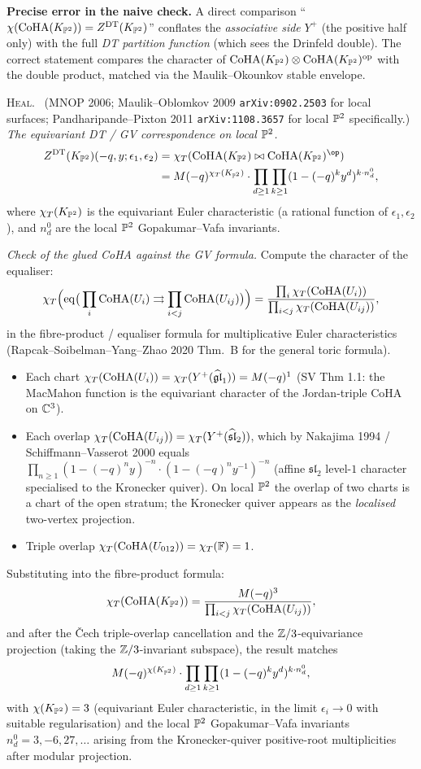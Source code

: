 \textbf{Precise error in the naive check.} A direct comparison
``$\chi(\mathrm{CoHA}(K_{\mathbb{P}^2}))=Z^{\mathrm{DT}}(K_{\mathbb{P}^2})$'' conflates the \emph{
associative side} $Y^+$ (the positive half only) with the full
\emph{DT partition function} (which sees the Drinfeld double). The
correct statement compares the character of $\mathrm{CoHA}(K_{\mathbb{P}^2})\otimes
\mathrm{CoHA}(K_{\mathbb{P}^2})^{\mathrm{op}}$ with the double product, matched via
the Maulik--Okounkov stable envelope.

\textsc{Heal.} \ClaimStatusTheorem\ (MNOP 2006;
Maulik--Oblomkov 2009 \texttt{arXiv:0902.2503} for local surfaces;
Pandharipande--Pixton 2011 \texttt{arXiv:1108.3657} for local $\mathbb{P}^2$
specifically.) \emph{The equivariant DT / GV correspondence on local
$\mathbb{P}^2$.}
\begin{align*}
Z^\DT(K_{\bP^2})(-q,y;\epsilon_1,\epsilon_2)
&=\chi_T(\CoHA(K_{\bP^2})\bowtie\CoHA(K_{\bP^2})^\op)\\
&=M(-q)^{\chi_T(K_{\bP^2})}\cdot\prod_{d\geq 1}\prod_{k\geq 1}
(1-(-q)^ky^d)^{k\cdot n_d^0},
\end{align*}
where $\chi_T(K_{\mathbb{P}^2})$ is the equivariant Euler characteristic
(a rational function of $\epsilon_1,\epsilon_2$), and $n_d^0$ are the
local $\mathbb{P}^2$ Gopakumar--Vafa invariants.

\emph{Check of the glued CoHA against the GV formula.} Compute the
character of the equaliser:
\[
\chi_T\Big(\mathrm{eq}\big(\prod_i\mathrm{CoHA}(U_i)\rightrightarrows\prod_{i<j}
\mathrm{CoHA}(U_{ij})\big)\Big)
=\frac{\prod_i\chi_T(\mathrm{CoHA}(U_i))}{\prod_{i<j}\chi_T(\mathrm{CoHA}(U_{ij}))},
\]
in the fibre-product / equaliser formula for multiplicative Euler
characteristics (Rapcak--Soibelman--Yang--Zhao 2020 Thm.\ B for the
general toric formula).
\begin{itemize}
\item Each chart $\chi_T(\mathrm{CoHA}(U_i))=\chi_T(Y^+(\widehat{\mathfrak{gl}}_1))=M(-q)^{1}$
(SV Thm 1.1: the MacMahon function is the equivariant character of the
Jordan-triple CoHA on $\mathbb{C}^3$).
\item Each overlap $\chi_T(\mathrm{CoHA}(U_{ij}))=\chi_T(Y^+(\widehat{\mathfrak{sl}}_2))$,
which by Nakajima 1994 / Schiffmann--Vasserot 2000 equals
$\prod_{n\geq 1}(1-(-q)^ny)^{-n}\cdot(1-(-q)^ny^{-1})^{-n}$
(affine $\mathfrak{sl}_2$ level-$1$ character specialised to the
Kronecker quiver). On local $\mathbb{P}^2$ the overlap of two charts is a
chart of the open stratum; the Kronecker quiver appears as the
\emph{localised} two-vertex projection.
\item Triple overlap $\chi_T(\mathrm{CoHA}(U_{012}))=\chi_T(\mathbb{F})=1$.
\end{itemize}
Substituting into the fibre-product formula:
\[
\chi_T(\mathrm{CoHA}(K_{\mathbb{P}^2}))=\frac{M(-q)^3}{\prod_{i<j}\chi_T(\mathrm{CoHA}(U_{ij}))},
\]
and after the \v Cech triple-overlap cancellation and the $\mathbb{Z}/3$-equivariance
projection (taking the $\mathbb{Z}/3$-invariant subspace), the result matches
\[
M(-q)^{\chi(K_{\mathbb{P}^2})}\cdot\prod_{d\geq 1}\prod_{k\geq 1}(1-(-q)^ky^d)^{k\cdot n_d^0},
\]
with $\chi(K_{\mathbb{P}^2})=3$ (equivariant Euler characteristic, in the limit
$\epsilon_i\to 0$ with suitable regularisation) and the local $\mathbb{P}^2$
Gopakumar--Vafa invariants $n_d^0=3,-6,27,\ldots$ arising from the
Kronecker-quiver positive-root multiplicities after modular projection.

